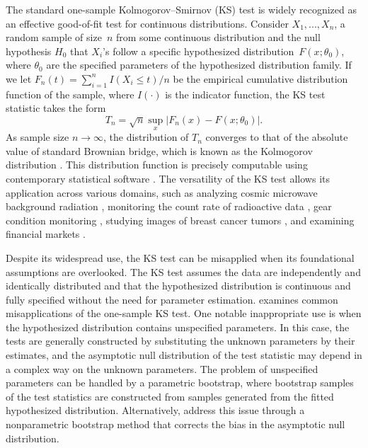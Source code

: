 \documentclass[12pt, titlepage, letterpaper]{article}
\begin{document}
The standard one-sample Kolmogorov--Smirnov (KS) test is widely
recognized as an effective good-of-fit test for continuous distributions.
Consider $X_1, ..., X_n$, a random sample of size~$n$ from some continuous
distribution and the null hypothesis $H_0$ that $X_i$'s follow a specific
hypothesized distribution~$F(x; \theta_0)$, where $\theta_0$ are the 
specified parameters
of the hypothesized distribution family.
If we let $F_n(t) = \sum_{i=1}^n I(X_i \le t) / n$ be the empirical cumulative
distribution function of the sample, where $I(\cdot)$ is the indicator
function, the KS test statistic takes the form
\begin{equation}
  \label{eq:ks_standard}
  T_n = \sqrt{n} \sup_x | F_{n}(x) - F(x; \theta_0)|.
\end{equation}
As sample size $n\to \infty$, the distribution of $T_n$ converges to that of the
absolute value of standard Brownian bridge, which is known as the Kolmogorov
distribution \citep{stephens1974edf}. This distribution function is
precisely computable using contemporary statistical software
\citep{marsaglia2003evaluating}. The versatility of the KS test allows its
application across various domains, such as analyzing cosmic microwave
background radiation \citep{naess2012application}, monitoring the count rate of
radioactive data \citep{aslam2020introducing}, gear condition monitoring
\citep{andrade2001gear}, studying images of breast cancer tumors
\citep{demidenko2004kolmogorov}, and examining financial markets
\citep{lux2001turbulence}.


Despite its widespread use, the KS test can be 
misapplied when its foundational assumptions are overlooked. The KS test 
assumes the data are independently and identically distributed and 
that the hypothesized distribution is continuous and fully specified without 
the need for parameter estimation. \citet{zeimbekakis2022misuses} examines
common misapplications of the one-sample KS test. One notable inappropriate
use is when the hypothesized distribution contains unspecified parameters.
In this case, the tests are generally constructed by substituting the unknown
parameters by their estimates, and the asymptotic null distribution of
the test statistic may depend in a complex way on the unknown parameters.
The problem of unspecified parameters can be handled by a parametric
bootstrap, where bootstrap samples of the test statistics are constructed from
samples generated from the fitted hypothesized distribution.
Alternatively, \citet{babu2004goodness} address this issue through a
nonparametric bootstrap method that corrects the bias in the asymptotic null
distribution.
\end{document}
